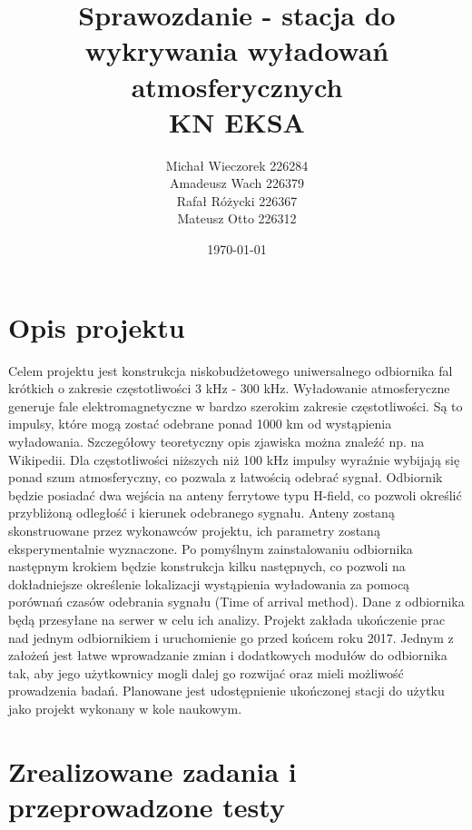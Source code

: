 \documentclass[12pt]{article}
\title{\textbf{Sprawozdanie - stacja do wykrywania wyładowań atmosferycznych}\\KN EKSA}
\author{Michał Wieczorek {226284}\\ Amadeusz Wach {226379}\\ Rafał Różycki {226367} \\ Mateusz Otto {226312}}
\date{\today}
\begin{document}
\maketitle
\newpage

\section{Opis projektu}
Celem projektu jest konstrukcja niskobudżetowego uniwersalnego odbiornika fal krótkich o zakresie częstotliwości 3 kHz - 300 kHz. Wyładowanie atmosferyczne generuje fale elektromagnetyczne w bardzo szerokim zakresie częstotliwości. Są to impulsy, które mogą zostać odebrane ponad 1000 km od wystąpienia wyładowania. Szczegółowy teoretyczny opis zjawiska można znaleźć np. na Wikipedii. Dla częstotliwości niższych niż 100 kHz impulsy wyraźnie wybijają się ponad szum atmosferyczny, co pozwala z łatwością odebrać sygnał. Odbiornik będzie posiadać dwa wejścia na anteny ferrytowe typu H-field, co pozwoli określić przybliżoną odległość i kierunek odebranego sygnału. Anteny zostaną skonstruowane przez wykonawców projektu, ich parametry zostaną eksperymentalnie wyznaczone. Po pomyślnym zainstalowaniu odbiornika następnym krokiem będzie konstrukcja kilku następnych, co pozwoli na dokładniejsze określenie lokalizacji wystąpienia wyładowania za pomocą porównań czasów odebrania sygnału (Time of arrival method). Dane z odbiornika będą przesyłane na serwer w celu ich analizy. Projekt zakłada ukończenie prac nad jednym odbiornikiem i uruchomienie go przed końcem roku 2017. Jednym z założeń jest łatwe wprowadzanie zmian i dodatkowych modułów do odbiornika tak, aby jego użytkownicy mogli dalej go rozwijać oraz mieli możliwość prowadzenia badań. Planowane jest udostępnienie ukończonej stacji do użytku jako projekt wykonany w kole naukowym.

\section{Zrealizowane zadania i przeprowadzone testy}
\end{document}
